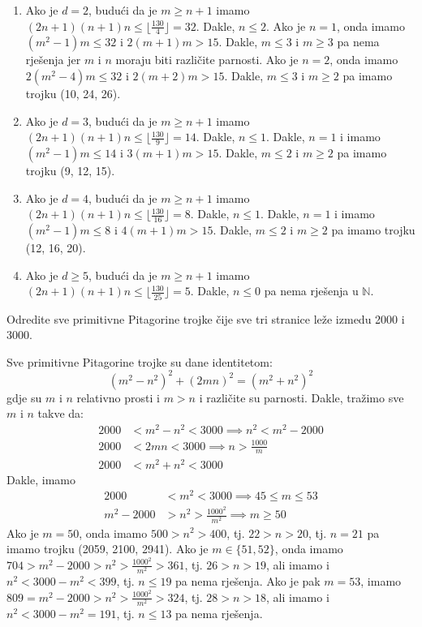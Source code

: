 \documentclass{exam}
\begin{document}
\begin{questions}
\begin{solution}
\begin{enumerate}
    \item Ako je $d = 2$, budući da je $m \geq n + 1$ imamo $(2n+1)(n+1)n \leq \lfloor \frac{130}{4} \rfloor = 32$. Dakle, $n \leq 2$. Ako je $n = 1$, onda imamo $(m^2-1)m \leq 32$ i $2(m+1)m > 15$. Dakle, $m \leq 3$ i $m \geq 3$ pa nema rješenja jer $m$ i $n$ moraju biti različite parnosti. Ako je $n = 2$, onda imamo $2(m^2-4)m \leq 32$ i $2(m+2)m > 15$. Dakle, $m \leq 3$ i $m \geq 2$ pa imamo trojku (10, 24, 26).

    \item Ako je $d = 3$, budući da je $m \geq n + 1$ imamo $(2n+1)(n+1)n \leq \lfloor \frac{130}{9} \rfloor = 14$. Dakle, $n \leq 1$. Dakle, $n = 1$ i imamo $(m^2-1)m \leq 14$ i $3(m+1)m > 15$. Dakle, $m \leq 2$ i $m \geq 2$ pa imamo trojku (9, 12, 15).

    \item Ako je $d = 4$, budući da je $m \geq n + 1$ imamo $(2n+1)(n+1)n \leq \lfloor \frac{130}{16} \rfloor = 8$. Dakle, $n \leq 1$. Dakle, $n = 1$ i imamo $(m^2-1)m \leq 8$ i $4(m+1)m > 15$. Dakle, $m \leq 2$ i $m \geq 2$ pa imamo trojku (12, 16, 20).

    \item Ako je $d \geq 5$, budući da je $m \geq n + 1$ imamo $(2n+1)(n+1)n \leq \lfloor \frac{130}{25} \rfloor = 5$. Dakle, $n \leq 0$ pa nema rješenja u $\mathbb{N}$.
  \end{enumerate}
\end{solution}

\question Odredite sve primitivne Pitagorine trojke čije sve tri stranice leže izmedu 2000 i 3000.

\begin{solution}
  Sve primitivne Pitagorine trojke su dane identitetom:
  \[
    (m^2-n^2)^2 + (2mn)^2 = (m^2+n^2)^2
  \]
  gdje su $m$ i $n$ relativno prosti i $m > n$ i različite su parnosti. Dakle, tražimo sve $m$ i $n$ takve da:
  \begin{align}
    2000 &< m^2-n^2 < 3000 \implies n^2 < m^2-2000\\
    2000 &< 2mn < 3000 \implies n > \frac{1000}{m}\\
    2000 &< m^2+n^2 < 3000
  \end{align}
  Dakle, imamo
  \begin{align*}
    2000 &< m^2 < 3000 \implies 45 \leq m \leq 53\\
    m^2 - 2000 &> n^2 > \frac{1000^2}{m^2} \implies m \geq 50
  \end{align*}
  Ako je $m = 50$, onda imamo $500 > n^2 > 400$, tj. $22 > n > 20$, tj. $n = 21$ pa imamo trojku (2059, 2100, 2941).
  Ako je $m \in \{51, 52\}$, onda imamo $704 > m^2 - 2000 > n^2 > \frac{1000^2}{m^2} > 361$, tj. $26 > n > 19$, ali imamo i $n^2 < 3000 - m^2 < 399$, tj. $n \leq 19$ pa nema rješenja.
  Ako je pak $m = 53$, imamo $809 = m^2 - 2000 > n^2 > \frac{1000^2}{m^2} > 324$, tj. $28 > n > 18$, ali imamo i $n^2 < 3000 - m^2 = 191$, tj. $n \leq 13$ pa nema rješenja.
\end{solution}


\end{questions}
\end{document}
